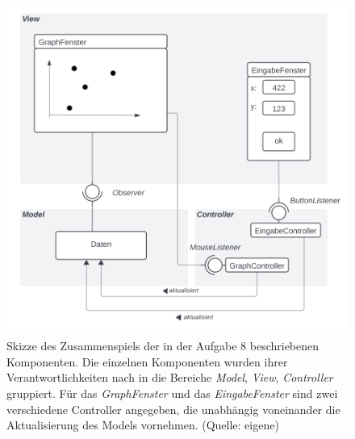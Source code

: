 \begin{figure}
    \centering
    \includegraphics[scale=0.4]{chapters/aufgabe 8/img/mvc}
    \caption{Skizze des Zusammenspiels der in der Aufgabe 8 beschriebenen Komponenten.
    Die einzelnen Komponenten wurden ihrer Verantwortlichkeiten nach in die Bereiche \textit{Model}, \textit{View}, \textit{Controller} gruppiert. Für das \textit{GraphFenster} und das \textit{EingabeFenster} sind zwei verschiedene Controller angegeben, die unabhängig voneinander die Aktualisierung des Models vornehmen. (Quelle: eigene)}
    \label{fig:mvc}
\end{figure}